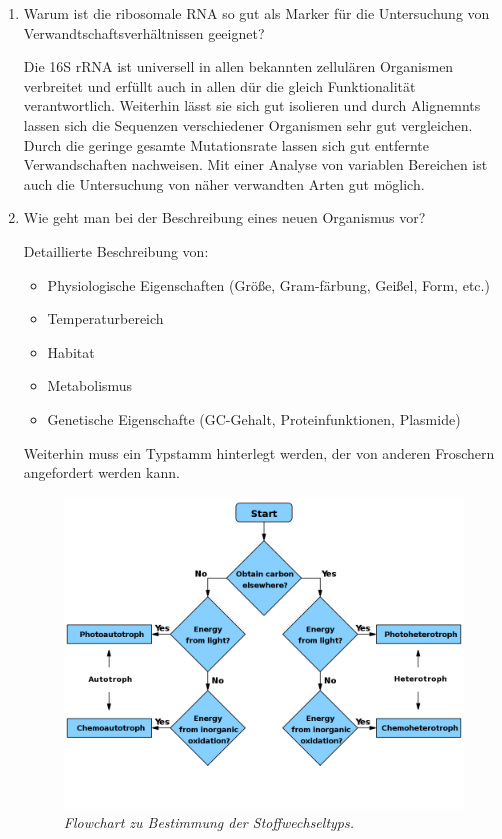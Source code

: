 \begin{enumerate}
\item Warum ist die ribosomale RNA so gut als Marker für die Untersuchung von Verwandtschaftsverhältnissen geeignet?
	
	Die 16S rRNA ist universell in allen bekannten zellulären Organismen verbreitet
	und erfüllt auch in allen dür die gleich Funktionalität verantwortlich.
	Weiterhin lässt sie sich gut isolieren
	und durch Alignemnts lassen sich die Sequenzen verschiedener Organismen sehr gut vergleichen.
	Durch die geringe gesamte Mutationsrate lassen sich gut entfernte Verwandschaften nachweisen.
	Mit einer Analyse von variablen Bereichen ist auch die Untersuchung von näher verwandten Arten gut möglich.

\item Wie geht man bei der Beschreibung eines neuen Organismus vor?
	
	Detaillierte Beschreibung von:
	\begin{itemize}
		\item Physiologische Eigenschaften (Größe, Gram-färbung, Geißel, Form, etc.)
		\item Temperaturbereich
		\item Habitat
		\item Metabolismus
		\item Genetische Eigenschafte (GC-Gehalt, Proteinfunktionen, Plasmide)
	\end{itemize}

	Weiterhin muss ein Typstamm hinterlegt werden,
	der von anderen Froschern angefordert werden kann.
		
	\begin{figure}[ht!]
	\leavevmode
	\begin{center}
		\includegraphics[scale=0.87]{./pictures/troph_flowchart}
	\end{center}
	\caption{\slshape{Flowchart zu Bestimmung der Stoffwechseltyps.}}
	\label{fig:troph_flow}
	\end{figure}

\end{enumerate}

